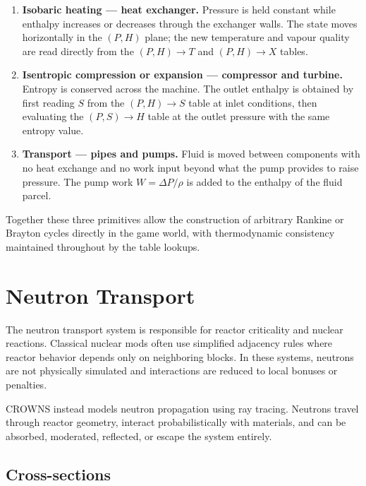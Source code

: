 \documentclass{report}
\begin{document}
\begin{enumerate}
    \item \textbf{Isobaric heating — heat exchanger.} Pressure is held constant while
          enthalpy increases or decreases through the exchanger walls. The state moves
          horizontally in the $(P, H)$ plane; the new temperature and vapour quality are
          read directly from the $(P,H) \rightarrow T$ and $(P,H) \rightarrow X$ tables.

    \item \textbf{Isentropic compression or expansion — compressor and turbine.}
          Entropy is conserved across the machine. The outlet enthalpy is obtained by
          first reading $S$ from the $(P,H) \rightarrow S$ table at inlet conditions,
          then evaluating the $(P,S) \rightarrow H$ table at the outlet pressure with
          the same entropy value.

    \item \textbf{Transport — pipes and pumps.} Fluid is moved between components with
          no heat exchange and no work input beyond what the pump provides to raise
          pressure. The pump work $W = \Delta P / \rho$ is added to the enthalpy of
          the fluid parcel.
\end{enumerate}

Together these three primitives allow the construction of arbitrary Rankine or
Brayton cycles directly in the game world, with thermodynamic consistency maintained
throughout by the table lookups.

\section{Neutron Transport}

The neutron transport system is responsible for reactor criticality and nuclear reactions.
Classical nuclear mods often use simplified adjacency rules where reactor behavior depends
only on neighboring blocks. In these systems, neutrons are not physically simulated and
interactions are reduced to local bonuses or penalties.

CROWNS instead models neutron propagation using ray tracing. Neutrons travel through reactor
geometry, interact probabilistically with materials, and can be absorbed, moderated, reflected,
or escape the system entirely.

\subsection{Cross-sections}
\end{document}
